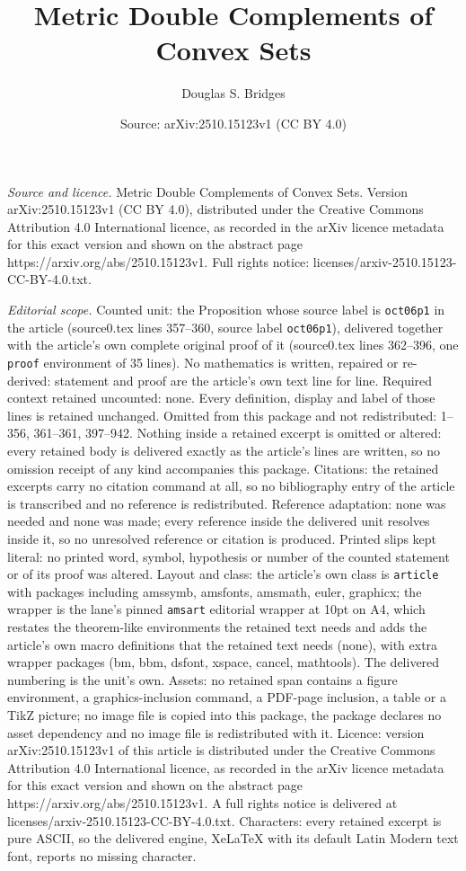 \documentclass[10pt,a4paper]{amsart}
\title[Metric Double Complements of Convex Sets]{Metric Double Complements of Convex Sets}
\author{Douglas S. Bridges}
\date{Source: arXiv:2510.15123v1 (CC BY 4.0)}
\begin{document}
\maketitle

\noindent\emph{Source and licence.} Metric Double Complements of Convex Sets. Version arXiv:2510.15123v1 (CC BY 4.0), distributed under the Creative Commons Attribution 4.0 International licence, as recorded in the arXiv licence metadata for this exact version and shown on the abstract page https://arxiv.org/abs/2510.15123v1. Full rights notice: licenses/arxiv-2510.15123-CC-BY-4.0.txt.\par\smallskip

\noindent\textit{Editorial scope.} Counted unit: the Proposition whose source label is \texttt{oct06p1} in the article (source0.tex lines 357--360, source label \texttt{oct06p1}), delivered together with the article's own complete original proof of it (source0.tex lines 362--396, one \texttt{proof} environment of 35 lines). No mathematics is written, repaired or re-derived: statement and proof are the article's own text line for line. Required context retained uncounted: none. Every definition, display and label of those lines is retained unchanged. Omitted from this package and not redistributed: 1--356, 361--361, 397--942. Nothing inside a retained excerpt is omitted or altered: every retained body is delivered exactly as the article's lines are written, so no omission receipt of any kind accompanies this package. Citations: the retained excerpts carry no citation command at all, so no bibliography entry of the article is transcribed and no reference is redistributed. Reference adaptation: none was needed and none was made; every reference inside the delivered unit resolves inside it, so no unresolved reference or citation is produced. Printed slips kept literal: no printed word, symbol, hypothesis or number of the counted statement or of its proof was altered. Layout and class: the article's own class is \texttt{article} with packages including amssymb, amsfonts, amsmath, euler, graphicx; the wrapper is the lane's pinned \texttt{amsart} editorial wrapper at 10pt on A4, which restates the theorem-like environments the retained text needs and adds the article's own macro definitions that the retained text needs (none), with extra wrapper packages (bm, bbm, dsfont, xspace, cancel, mathtools). The delivered numbering is the unit's own. Assets: no retained span contains a figure environment, a graphics-inclusion command, a PDF-page inclusion, a table or a TikZ picture; no image file is copied into this package, the package declares no asset dependency and no image file is redistributed with it. Licence: version arXiv:2510.15123v1 of this article is distributed under the Creative Commons Attribution 4.0 International licence, as recorded in the arXiv licence metadata for this exact version and shown on the abstract page https://arxiv.org/abs/2510.15123v1. A full rights notice is delivered at licenses/arxiv-2510.15123-CC-BY-4.0.txt. Characters: every retained excerpt is pure ASCII, so the delivered engine, XeLaTeX with its default Latin Modern text font, reports no missing character.
\end{document}
